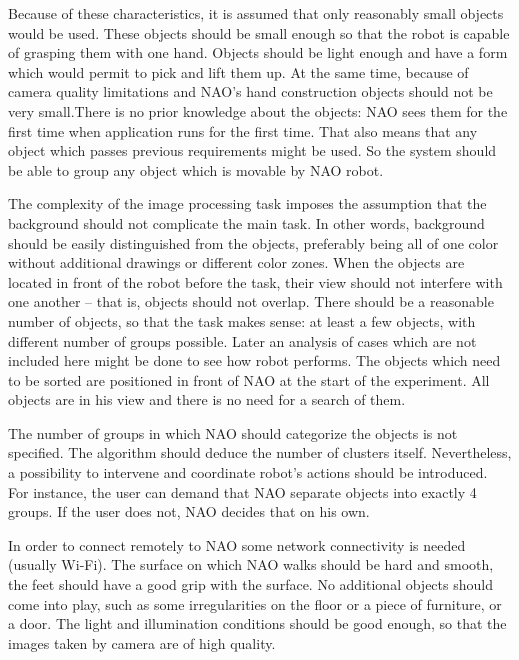 Because of these characteristics, it is assumed that only reasonably small objects would be used. These objects should be small enough so that the robot is capable of grasping them with one hand. Objects should be light enough and have a form which would permit to pick and lift them up. At the same time, because of camera quality limitations and NAO's hand construction objects should not be very small.There is no prior knowledge about the objects: NAO sees them for the first time when application runs for the first time. That also means that any object which passes previous requirements might be used. So the system should be able to group any object which is movable by NAO robot.

        The complexity of the image processing task imposes the assumption that the background should not complicate the main task. In other words, background should be easily distinguished from the objects, preferably being all of one color without additional drawings or different color zones. When the objects are located in front of the robot before the task, their view should not interfere with one another -- that is, objects should not overlap. There should be a reasonable number of objects, so that the task makes sense: at least a few objects, with different number of groups possible. Later an analysis of cases which are not included here might be done to see how robot performs. The objects which need to be sorted are positioned in front of NAO at the start of the experiment. All objects are in his view and there is no need for a search of them. 

The number of groups in which NAO should categorize the objects is not specified. The algorithm should deduce the number of clusters itself. Nevertheless, a possibility to intervene and coordinate robot’s actions should be introduced. For instance, the user can demand that NAO separate objects into exactly 4 groups. If the user does not, NAO decides that on his own.

    In order to connect remotely to NAO some network connectivity is needed (usually Wi-Fi). The surface on which NAO walks should be hard and smooth, the feet should have a good grip with the surface. No additional objects should come into play, such as some irregularities on the floor or a piece of furniture, or a door. The light and illumination conditions should be good enough, so that the images taken by camera are of high quality.


